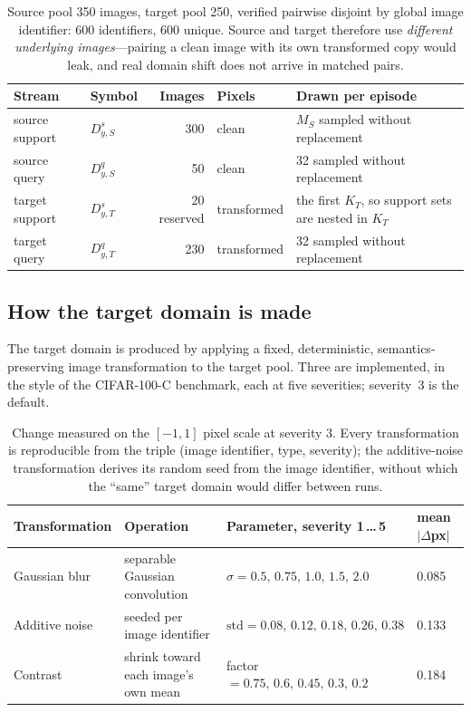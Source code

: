 \documentclass[11pt]{article}
\newcommand{\KT}{K_{T}}
\newcommand{\MS}{M_{S}}
\newcommand{\Dss}{D^{s}_{y,S}}
\newcommand{\Dqs}{D^{q}_{y,S}}
\newcommand{\Dst}{D^{s}_{y,T}}
\newcommand{\Dqt}{D^{q}_{y,T}}
\begin{document}
\begin{table}[htbp]
\centering\small
\begin{tabular}{@{}llrl p{5.2cm}@{}}
\toprule
\textbf{Stream} & \textbf{Symbol} & \textbf{Images} & \textbf{Pixels} & \textbf{Drawn per episode} \\
\midrule
source support & $\Dss$ & 300 & clean       & $\MS$ sampled without replacement \\
source query   & $\Dqs$ & 50  & clean       & 32 sampled without replacement \\
target support & $\Dst$ & 20 reserved & transformed & the first $\KT$, so support sets are
                                                       nested in $\KT$ \\
target query   & $\Dqt$ & 230 & transformed & 32 sampled without replacement \\
\bottomrule
\end{tabular}
\caption{Source pool 350 images, target pool 250, verified pairwise disjoint by global image
identifier: 600 identifiers, 600 unique. Source and target therefore use \emph{different
underlying images}---pairing a clean image with its own transformed copy would leak, and real
domain shift does not arrive in matched pairs.}
\end{table}

\subsection{How the target domain is made}

The target domain is produced by applying a fixed, deterministic, semantics-preserving image
transformation to the target pool. Three are implemented, in the style of the CIFAR-100-C
benchmark, each at five severities; severity~3 is the default.

\begin{table}[htbp]
\centering\footnotesize
\begin{tabular}{@{}llll@{}}
\toprule
\textbf{Transformation} & \textbf{Operation} & \textbf{Parameter, severity 1\,\ldots\,5} & \textbf{mean $|\Delta$px$|$} \\
\midrule
Gaussian blur     & separable Gaussian convolution     & $\sigma=0.5,\,0.75,\,1.0,\,1.5,\,2.0$ & 0.085 \\
Additive noise    & seeded per image identifier        & $\mathrm{std}=0.08,\,0.12,\,0.18,\,0.26,\,0.38$ & 0.133 \\
Contrast          & shrink toward each image's own mean & factor $=0.75,\,0.6,\,0.45,\,0.3,\,0.2$ & 0.184 \\
\bottomrule
\end{tabular}
\caption{Change measured on the $[-1,1]$ pixel scale at severity 3. Every transformation is
reproducible from the triple (image identifier, type, severity); the additive-noise transformation
derives its random seed from the image identifier, without which the ``same'' target domain would
differ between runs.}
\end{table}
\end{document}
